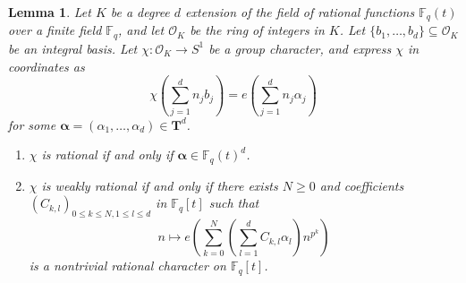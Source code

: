 \documentclass{amsart}
\newtheorem{lemma}[theorem]{Lemma}
\theoremstyle{definition}
\numberwithin{equation}{section}
\newcommand{\F}{\mathbb{F}}
\newcommand{\mO}{\mathcal{O}}
\begin{document}
\begin{lemma} \label{lem: rational character rational element}
    Let $K$ be a degree $d$ extension of the field of rational functions $\F_q(t)$ over a finite field $\F_q$, and let $\mO_K$ be the ring of integers in $K$.
    Let $\{b_1, \dots, b_d\} \subseteq \mO_K$ be an integral basis.
    Let $\chi : \mO_K \to S^1$ be a group character, and express $\chi$ in coordinates as
    \begin{equation*}
        \chi \left( \sum_{j=1}^d n_j b_j \right) = e \left( \sum_{j=1}^d n_j \alpha_j \right)
    \end{equation*}
    for some $\bm{\alpha} = (\alpha_1, \dots, \alpha_d) \in \mathbf{T}^d$.
    \begin{enumerate}[(1)]
        \item $\chi$ is rational if and only if $\bm{\alpha} \in \F_q(t)^d$.
        \item $\chi$ is weakly rational if and only if there exists $N \ge 0$ and coefficients $(C_{k,l})_{0 \le k \le N, 1 \le l \le d}$ in $\F_q[t]$ such that
        \begin{equation*}
            n \mapsto e \left( \sum_{k=0}^N \left( \sum_{l=1}^d C_{k,l} \alpha_l \right) n^{p^k} \right)
        \end{equation*}
        is a nontrivial rational character on $\F_q[t]$.
    \end{enumerate}
\end{lemma}
\end{document}
